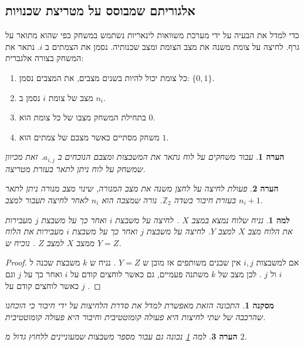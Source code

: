 \documentclass[12pt,leqno]{article}
\theoremstyle{theoremdd}
\newtheorem{corollary}{מסקנה}[section]
\newtheorem{lemma}{למה}[section]
\newtheorem{comm}{הערה}[section]
\begin{document}
\subsection{אלגוריתם שמבוסס על מטריצת שכנויות}
\label{subsec:neighborhood-matrix-alg}
כדי למדל את הבעיה על ידי מערכת משוואות לינאריות
נשתמש במשחק כפי שהוא מתואר על גרף.
 לחיצה על צומת משנה את מצב הצומת ומצב שכנותיה.
נסמן את הצמתים ב
$i$.
נתאר את המשחק בצורה אלגברית:
\begin{enumerate}
    \item 
כל צומת יכול להיות בשנים מצבים,
את המצבים נסמן:
    $\{0,1\}$.
    \item 
מצב של צומת 
    $i$
נסמן ב
    $n_i$.
    \item 
    בתחילת המשחק מצבו של כל צומת הוא 
    $0$.
    \item 
    משחק מסתיים כאשר מצבם של צמתים 
    הוא 
    $1$.
\end{enumerate}
\begin{comm}
    עבור משחקים על לוח נתאר את המשבצות ומצבם הנוכחים ב
    $a_{i,j}$.
    זאת מכיוון שמשחק על לוח ניתן לתאר בעזרת מטריצה.
\end{comm}
\begin{comm}
\label{comm: sum as press operator on board}
פעולת לחיצה על לחצן משנה 
את מצב המנורה,
שינוי מצב מנורה ניתן לתאר בעזרת חיבור בשדה 
$\mathbb{Z}_2$.
נורה שמצבה הוא
$n_i$
לאחר לחיצה תעבור למצב
$n_i + 1$.
\end{comm}
\begin{lemma}
    \label{lemma: order presses}
    נניח שלוח נמצא במצב
    $X$
    .
    לחיצה על משבצת
    $i$
    ואחר כך על משבצת
    $j$
    מעבירות את הלוח מצב
    $X$
    למצב
    $Y$.
    לחיצה על משבצת
    $j$
    ואחר כך על משבצת
    $i$
    מעבירות את הלוח ממצב
    $X$
    למצב
    $Z$
    .
    נוכיח ש
    $Y=Z$.
\end{lemma}
\begin{proof}
    אם למשבצות 
    $i,j$
    אין שכנים משותפים אז מובן ש
    $Y=Z$
    .
    נניח ש
    $k$
    משבצת שכנה ל
    $i$
    ול
    $j$
    . 
    לכן מצב של 
    $k$
    משתנה פעמיים,
    גם כאשר לוחצים קודם על
    $i$
    ואחר כך על 
    $j$
    וגם כאשר לוחצים קודם על 
    $j$
    .
\end{proof}
\begin{corollary}
    התכונה הזאת מאפשרת למדל את סדרת הלחיצות
    על ידי חיבור כי הוכחנו שהרכבה של שתי לחיצות היא
    פעולה קומוטטיבית וחיבור היא פעולה קומוטטיבית. 
\end{corollary}
\begin{comm}
    למה
    \ref{lemma: order presses}
    נכונה גם עבור מספר משבצות שמעוניינים ללחוץ גדול מ
    $2$.
\end{comm}
\end{document}
